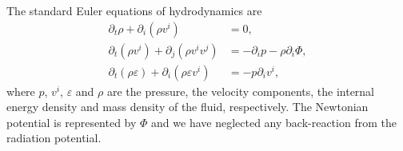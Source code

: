 The standard Euler equations of hydrodynamics are
\begin{subequations} 
\begin{align}
\partial_t \rho + \partial_i (\rho v^i) &= 0, \label{eqT:cont} \\  
\partial_t (\rho v^i) + \partial_j (\rho v^i v^j) & = -\partial_i p - \rho \partial_i \Phi, \label{eqT:mom} \\ 
\partial_t (\rho \varepsilon) + \partial_i (\rho \varepsilon v^i) & = -p \partial_i v^i, \label{eqT:enrg} 
\end{align}
\end{subequations}
where $p$, $v^i$, $\varepsilon$ and $\rho$ are the pressure, the velocity components, the internal energy density
and mass density of the fluid, respectively. The Newtonian potential is represented by $\Phi$ and we have 
neglected any back-reaction from the radiation potential.  

